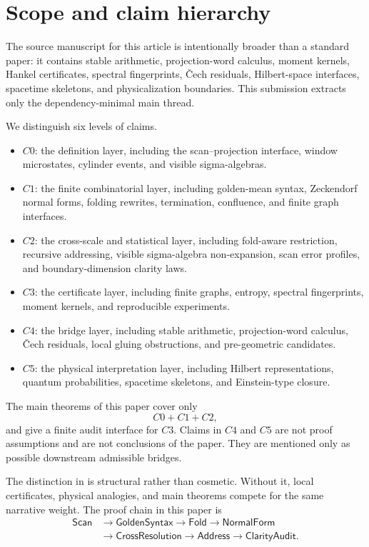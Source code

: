 \section{Scope and claim hierarchy}
\label{sec:scope}

The source manuscript for this article is intentionally broader than a standard paper: it contains stable arithmetic, projection-word calculus, moment kernels, Hankel certificates, spectral fingerprints, \v{C}ech residuals, Hilbert-space interfaces, spacetime skeletons, and physicalization boundaries.  This submission extracts only the dependency-minimal main thread.

\begin{definition}
\label{def:claim-hierarchy}
We distinguish six levels of claims.
\begin{itemize}
\item \(C0\): the definition layer, including the scan--projection interface, window microstates, cylinder events, and visible sigma-algebras.
\item \(C1\): the finite combinatorial layer, including golden-mean syntax, Zeckendorf normal forms, folding rewrites, termination, confluence, and finite graph interfaces.
\item \(C2\): the cross-scale and statistical layer, including fold-aware restriction, recursive addressing, visible sigma-algebra non-expansion, scan error profiles, and boundary-dimension clarity laws.
\item \(C3\): the certificate layer, including finite graphs, entropy, spectral fingerprints, moment kernels, and reproducible experiments.
\item \(C4\): the bridge layer, including stable arithmetic, projection-word calculus, \v{C}ech residuals, local gluing obstructions, and pre-geometric candidates.
\item \(C5\): the physical interpretation layer, including Hilbert representations, quantum probabilities, spacetime skeletons, and Einstein-type closure.
\end{itemize}
\end{definition}

The main theorems of this paper cover only
\[
C0+C1+C2,
\]
and give a finite audit interface for \(C3\).  Claims in \(C4\) and \(C5\) are not proof assumptions and are not conclusions of the paper.  They are mentioned only as possible downstream admissible bridges.

\begin{remark}
The distinction in  is structural rather than cosmetic.  Without it, local certificates, physical analogies, and main theorems compete for the same narrative weight.  The proof chain in this paper is
\[
\begin{aligned}
\mathsf{Scan}
&\to \mathsf{GoldenSyntax}
\to \mathsf{Fold}
\to \mathsf{NormalForm}\\
&\to \mathsf{CrossResolution}
\to \mathsf{Address}
\to \mathsf{ClarityAudit}.
\end{aligned}
\]
\end{remark}

